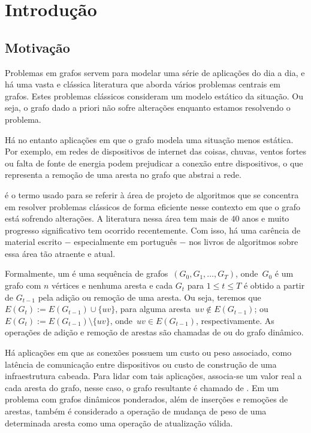 \chapter{Introdução}

\section{Motivação}
\label{sec:Motivação}

Problemas em grafos servem para modelar uma série de aplicações do dia a dia,
e há uma vasta e clássica literatura que aborda vários problemas centrais em grafos.
Estes problemas clássicos consideram um modelo estático da situação. Ou seja, o grafo dado a priori não sofre alterações enquanto estamos resolvendo o problema.

Há no entanto aplicações em que o grafo modela uma situação menos estática. Por exemplo, em redes de dispositivos de internet das coisas, chuvas, ventos fortes ou falta de fonte de energia podem prejudicar a conexão entre dispositivos, o que representa a remoção de uma aresta no grafo que abstrai a rede.

 é o termo usado para se referir à área de projeto de algoritmos que se concentra em resolver problemas clássicos de forma eficiente nesse contexto em que o grafo está sofrendo alterações. A literatura nessa área tem mais de $40$ anos e muito progresso significativo tem ocorrido recentemente.  Com isso, há uma carência de material escrito $-$ especialmente em português $-$ nos livros de algoritmos sobre essa área tão atraente e atual.

Formalmente, um  é uma sequência de grafos~$(G_0, G_1,\ldots, G_T)$, onde~$G_0$ é um grafo com $n$ vértices e nenhuma aresta e
cada $G_t$ para $1\leq t\leq T$ é obtido a partir de $G_{t-1}$ pela adição ou remoção de uma aresta. Ou seja, teremos que $E(G_t) := E(G_{t-1})\cup \{uv\}$, para alguma aresta~$uv\notin E(G_{t-1})$;
ou $E(G_t) := E(G_{t-1})\setminus \{uv\}$, onde~$uv\in E(G_{t-1})$, respectivamente.
As operações de adição e remoção de arestas são chamadas de  ou  do grafo dinâmico.

Há aplicações em que as conexões possuem um custo ou peso associado,
como latência de comunicação entre dispositivos ou custo de construção de uma infraestrutura cabeada. 
Para lidar com tais aplicações, associa-se um valor real a cada aresta do grafo,
nesse caso, o grafo resultante é chamado de .
Em um problema com grafos dinâmicos ponderados, além de inserções e remoções de arestas, também é considerado a operação
de mudança de peso de uma determinada aresta como uma operação de atualização válida.

